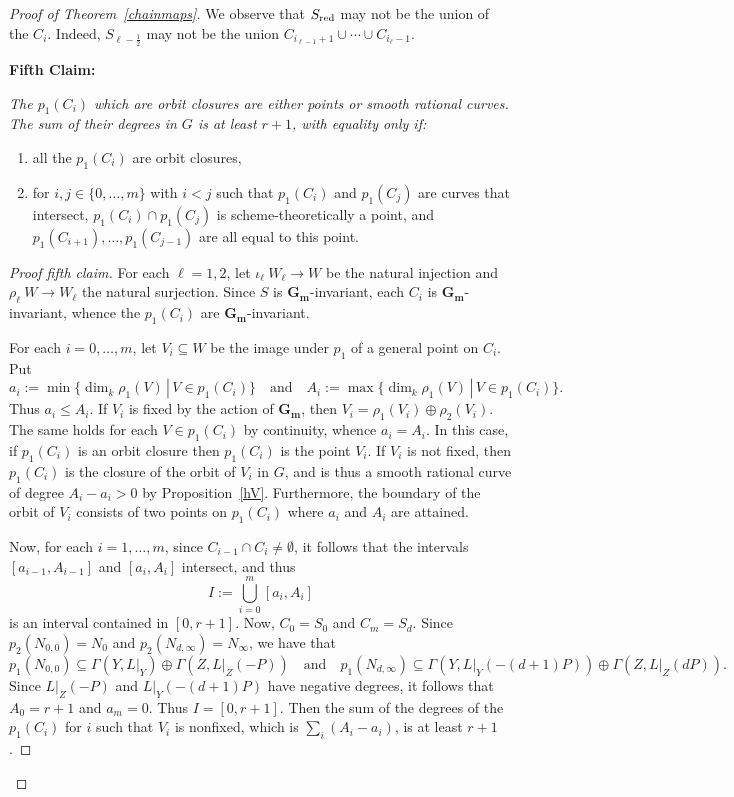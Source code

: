 \documentclass[10pt,a4paper]{amsart}
\def\cc{{\mathbf G}_{\mathbf m}}
\def\red{\text{\rm red}}
\begin{document}
\begin{proof}[Proof of Theorem~\ref{chainmaps}]
We observe that $S_\red$ may not be the union of the $C_i$. Indeed, 
$S_{\ell-\frac{1}{2}}$ may not be the union $C_{i_{\ell-1}+1}\cup\cdots\cup C_{i_{\ell}-1}$.

\vskip0.2cm

{\bf Fifth Claim:} {\it The $p_1(C_i)$ which are orbit closures are either points or smooth rational curves. The sum of their degrees in $G$ is at least $r+1$, with equality only if:
\begin{enumerate}
    \item all the $p_1(C_i)$ are orbit closures, 
    \item for $i,j\in\{0,\dots,m\}$ with $i<j$ such that $p_1(C_i)$ and $p_1(C_j)$ are curves that intersect, $p_1(C_i)\cap p_1(C_j)$ is scheme-theoretically a point, and $p_1(C_{i+1}),\dots,p_1(C_{j-1})$ are all equal to this point.
\end{enumerate}}

\begin{proof}[Proof fifth claim] For each $\ell=1,2$, let $\iota_\ell\:W_\ell\to W$ be the natural injection and $\rho_\ell\:W\to W_\ell$ the natural surjection. Since $S$ is $\cc$-invariant, each $C_i$ is $\cc$-invariant, whence the $p_1(C_i)$ are $\cc$-invariant. 

For each $i=0,\dots,m$, let $V_i\subseteq W$ be the image under $p_1$ of a general point on $C_i$. Put 
\[
a_i:=\min\{\dim_k\rho_1(V)\,|\,V\in p_1(C_i)\}
\quad\text{and}\quad 
A_i:=\max\{\dim_k\rho_1(V)\,|\,V\in p_1(C_i)\}.
\]
Thus $a_i\leq A_i$. If $V_i$ is fixed by the action of $\cc$, then $V_i=\rho_1(V_i)\oplus\rho_2(V_i)$. The same holds for each $V\in p_1(C_i)$ by continuity, whence $a_i=A_i$. In this case, if $p_1(C_i)$ is an orbit closure then $p_1(C_i)$ is the point $V_i$. If $V_i$ is not fixed, then $p_1(C_i)$ is the closure of the orbit of $V_i$ in $G$, and is thus a smooth rational curve of degree $A_i-a_i>0$ by Proposition~\ref{hV}. Furthermore, the boundary of the orbit of $V_i$ consists of two points on $p_1(C_i)$ where $a_i$ and $A_i$ are attained. 

Now, for each $i=1,\dots,m$, since $C_{i-1}\cap C_i\neq\emptyset$, it follows that  
the intervals $[a_{i-1},A_{i-1}]$ and $[a_i,A_i]$ intersect, and thus 
\[
I:=\bigcup_{i=0}^m[a_i,A_i]
\]
is an interval contained in $[0,r+1]$.
Now, $C_0=S_0$ and $C_m=S_d$. Since $p_2(N_{0,0})=N_0$ and $p_2(N_{d,\infty})=N_\infty$, we have that
\[
p_1(N_{0,0})\subseteq\Gamma(Y,L|_Y)\oplus\Gamma(Z,L|_Z(-P))\quad
\text{and}\quad 
p_1(N_{d,\infty})\subseteq\Gamma(Y,L|_Y(-(d+1)P))\oplus\Gamma(Z,L|_Z(dP)).
\]
Since $L|_Z(-P)$ and $L|_Y(-(d+1)P)$ have negative degrees, it follows that $A_0=r+1$ and $a_m=0$. 
Thus $I=[0,r+1]$. Then the sum of the degrees of the $p_1(C_i)$ for $i$ such that $V_i$ is nonfixed, which is $\sum_i(A_i-a_i)$, is at least $r+1$.


\end{proof}
\end{proof}
\end{document}
